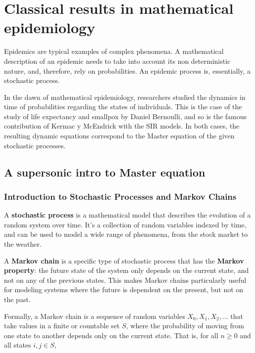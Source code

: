 \chapter{Classical results in mathematical epidemiology}


Epidemics are typical examples of complex phenomena. A mathematical description of an epidemic needs to take into account its non deterministic nature, and, therefore, rely on probabilities. An epidemic process is, essentially, a stochastic process. 

In the dawn of mathematical epidemiology, researchers studied the dynamics in time of probabilities regarding the states of individuals. This is the case of  the study of life expectancy and smallpox by Daniel Bernoulli, and so is the famous contribution of Kermac y McEndrick with the SIR models. In both cases, the resulting dynamic equations correspond to the Master equation of the given stochastic processes.


\section{A supersonic intro to Master equation}


\subsection*{Introduction to Stochastic Processes and Markov Chains}

A \textbf{stochastic process} is a mathematical model that describes the evolution of a random system over time. It's a collection of random variables indexed by time, and can be used to model a wide range of phenomena, from the stock market to the weather.

A \textbf{Markov chain} is a specific type of stochastic process that has the \textbf{Markov property}: the future state of the system only depends on the current state, and not on any of the previous states. This makes Markov chains particularly useful for modeling systems where the future is dependent on the present, but not on the past.

Formally, a Markov chain is a sequence of random variables $X_0, X_1, X_2, \ldots$ that take values in a finite or countable set $S$, where the probability of moving from one state to another depends only on the current state. That is, for all $n \geq 0$ and all states $i, j \in S$,

